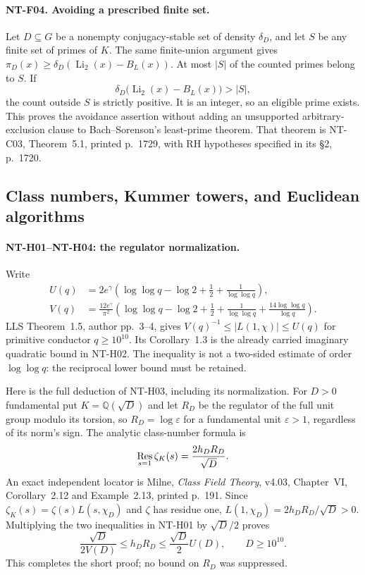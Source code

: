 \paragraph{NT-F04. Avoiding a prescribed finite set.}
Let $D\subseteq G$ be a nonempty conjugacy-stable set of density
$\delta_D$, and let $S$ be any finite set of primes of $K$.  The same
finite-union argument gives
$\pi_D(x)\ge\delta_D(\operatorname{Li}_2(x)-B_L(x))$.
At most $|S|$ of the counted primes belong to $S$.  If
\[
 \delta_D\bigl(\operatorname{Li}_2(x)-B_L(x)\bigr)>|S|,
\]
the count outside $S$ is strictly positive.  It is an integer, so an
eligible prime exists.  This proves the avoidance assertion without adding
an unsupported arbitrary-exclusion clause to Bach--Sorenson's least-prime
theorem.  That theorem is NT-C03, Theorem~5.1, printed p.~1729, with
RH hypotheses specified in its \S2, p.~1720.

\subsection{Class numbers, Kummer towers, and Euclidean algorithms}

\paragraph{NT-H01--NT-H04: the regulator normalization.}
Write
\begin{align*}
 U(q)&=2e^\gamma\left(\log\log q-\log2+\tfrac12+
                                      \frac1{\log\log q}\right),\\
 V(q)&=\frac{12e^\gamma}{\pi^2}\left(\log\log q-\log2+\tfrac12+
                   \frac1{\log\log q}+\frac{14\log\log q}{\log q}\right).
\end{align*}
LLS Theorem~1.5, author pp.~3--4, gives
$V(q)^{-1}\le|L(1,\chi)|\le U(q)$ for primitive conductor
$q\ge10^{10}$.  Its Corollary~1.3 is the already carried imaginary
quadratic bound in NT-H02.  The inequality is not a two-sided estimate of
order $\log\log q$: the reciprocal lower bound must be retained.

Here is the full deduction of NT-H03, including its normalization.
For $D>0$ fundamental put $K=\mathbb Q(\sqrt D)$ and let $R_D$ be the
regulator of the full unit group modulo its torsion, so
$R_D=\log\varepsilon$ for a fundamental unit $\varepsilon>1$, regardless
of its norm's sign.  The analytic class-number formula is
\[
 \mathop{\rm Res}_{s=1}\zeta_K(s)=\frac{2h_DR_D}{\sqrt D}.
\]
An exact independent locator is Milne, \emph{Class Field Theory}, v4.03,
Chapter~VI, Corollary~2.12 and Example~2.13, printed p.~191.
Since $\zeta_K(s)=\zeta(s)L(s,\chi_D)$ and $\zeta$ has residue one,
$L(1,\chi_D)=2h_DR_D/\sqrt D>0$.
Multiplying the two inequalities in NT-H01 by $\sqrt D/2$ proves
\[
 \frac{\sqrt D}{2V(D)}\le h_DR_D\le\frac{\sqrt D}{2}U(D),
 \qquad D\ge10^{10}.
\]
This completes the short proof; no bound on $R_D$ was suppressed.

